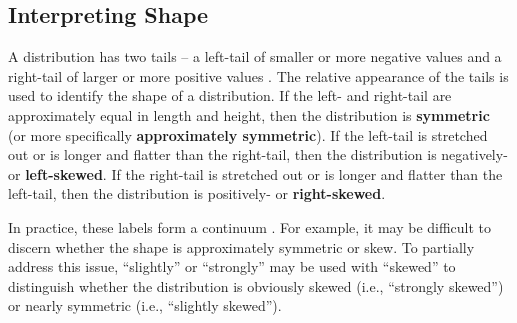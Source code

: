 \subsection{Interpreting Shape}
\vspace{-3pt}
A distribution has two tails -- a left-tail of smaller or more negative values and a right-tail of larger or more positive values . The relative appearance of the tails is used to identify the shape of a distribution. If the left- and right-tail are approximately equal in length and height, then the distribution is \textbf{symmetric} (or more specifically \textbf{approximately symmetric}). If the left-tail is stretched out or is longer and flatter than the right-tail, then the distribution is negatively- or \textbf{left-skewed}. If the right-tail is stretched out or is longer and flatter than the left-tail, then the distribution is positively- or \textbf{right-skewed}.

\begin{knitrout}
\color{fgcolor}\begin{kframe}


{\ttfamily\noindent\bfseries{}}

{\ttfamily\noindent\bfseries{}}\end{kframe}
\end{knitrout}

\vspace{-12pt}

In practice, these labels form a continuum . For example, it may be difficult to discern whether the shape is approximately symmetric or skew. To partially address this issue, ``slightly'' or ``strongly'' may be used with ``skewed'' to distinguish whether the distribution is obviously skewed (i.e., ``strongly skewed'') or nearly symmetric (i.e., ``slightly skewed'').

\vspace{-3pt}

